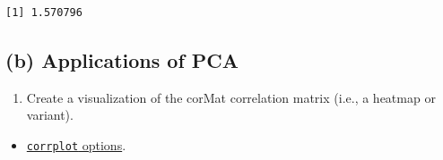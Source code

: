 \documentclass[
  letterpaper,
  DIV=11,
  numbers=noendperiod]{scrartcl}
\newenvironment{Shaded}{}{}
\newcommand{\DecValTok}[1]{\textcolor[rgb]{0.00,0.36,0.77}{#1}}
\newcommand{\FunctionTok}[1]{\textcolor[rgb]{0.44,0.26,0.76}{#1}}
\newcommand{\NormalTok}[1]{\textcolor[rgb]{0.14,0.16,0.18}{#1}}
\newcommand{\OtherTok}[1]{\textcolor[rgb]{0.44,0.26,0.76}{#1}}
\newcommand{\SpecialCharTok}[1]{\textcolor[rgb]{0.00,0.36,0.77}{#1}}
\providecommand{\tightlist}{%
  \setlength{\itemsep}{0pt}\setlength{\parskip}{0pt}}\usepackage{longtable,booktabs,array}
\begin{document}
\begin{Shaded}
\end{Shaded}

\begin{verbatim}
[1] 1.570796
\end{verbatim}

\newpage

\hypertarget{b-applications-of-pca}{%
\subsection{(b) Applications of PCA}\label{b-applications-of-pca}}

\begin{enumerate}
\def\labelenumi{\roman{enumi}.}
\tightlist
\item
  Create a visualization of the corMat correlation matrix (i.e., a
  heatmap or variant).
\end{enumerate}

\begin{itemize}
\tightlist
\item
  \href{https://cran.r-project.org/web/packages/corrplot/vignettes/corrplot-intro.html}{\texttt{corrplot}
  options}.
\end{itemize}
\end{document}
